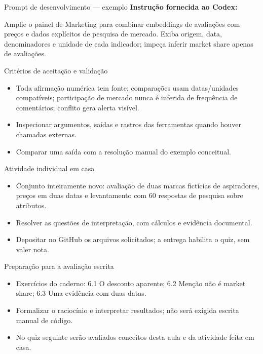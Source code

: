 \documentclass[10pt,aspectratio=169]{beamer}
\begin{document}
\begin{frame}[t]{Prompt de desenvolvimento — exemplo}
\small
\small\textbf{Instrução fornecida ao Codex:}\par\vspace{5mm}Amplie o painel de Marketing para combinar embeddings de avaliações com preços e dados explícitos de pesquisa de mercado. Exiba origem, data, denominadores e unidade de cada indicador; impeça inferir market share apenas de avaliações.
\end{frame}

\begin{frame}[t]{Critérios de aceitação e validação}
\small
\begin{itemize}
\item Toda afirmação numérica tem fonte; comparações usam datas/unidades compatíveis; participação de mercado nunca é inferida de frequência de comentários; conflito gera alerta visível.
\item Inspecionar argumentos, saídas e rastros das ferramentas quando houver chamadas externas.
\item Comparar uma saída com a resolução manual do exemplo conceitual.
\end{itemize}
\end{frame}

\begin{frame}[t]{Atividade individual em casa}
\small
\begin{itemize}
\item Conjunto inteiramente novo: avaliação de duas marcas fictícias de aspiradores, preços em duas datas e levantamento com 60 respostas de pesquisa sobre atributos.
\item Resolver as questões de interpretação, com cálculos e evidência documental.
\item Depositar no GitHub os arquivos solicitados; a entrega habilita o quiz, sem valer nota.
\end{itemize}
\end{frame}

\begin{frame}[t]{Preparação para a avaliação escrita}
\small
\begin{itemize}
\item Exercícios do caderno: 6.1 O desconto aparente; 6.2 Menção não é market share; 6.3 Uma evidência com duas datas.
\item Formalizar o raciocínio e interpretar resultados; não será exigida escrita manual de código.
\item No quiz seguinte serão avaliados conceitos desta aula e da atividade feita em casa.
\end{itemize}
\end{frame}
\end{document}
